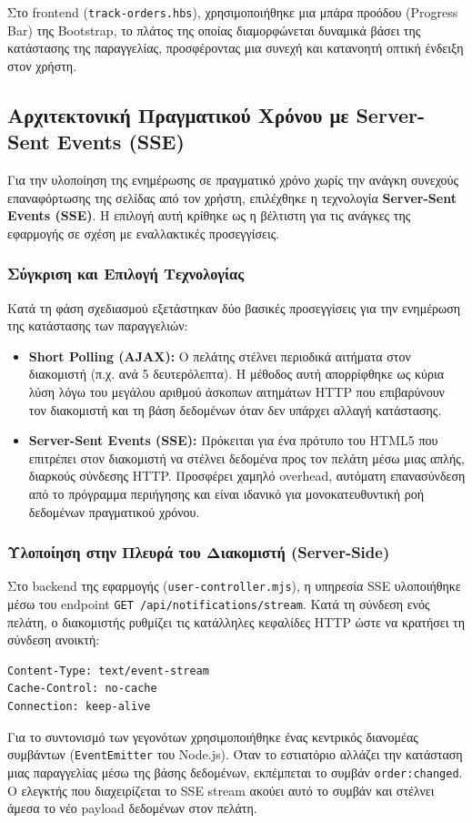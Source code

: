 \documentclass[acmsmall,screen,nonacm]{acmart}
\begin{document}
	Στο frontend (\texttt{track-orders.hbs}), χρησιμοποιήθηκε μια μπάρα προόδου (Progress Bar) της Bootstrap, το πλάτος της οποίας διαμορφώνεται δυναμικά βάσει της κατάστασης της παραγγελίας, προσφέροντας μια συνεχή και κατανοητή οπτική ένδειξη στον χρήστη.

	\subsection{Αρχιτεκτονική Πραγματικού Χρόνου με Server-Sent Events (SSE)}
	Για την υλοποίηση της ενημέρωσης σε πραγματικό χρόνο χωρίς την ανάγκη συνεχούς επαναφόρτωσης της σελίδας από τον χρήστη, επιλέχθηκε η τεχνολογία \textbf{Server-Sent Events (SSE)}. Η επιλογή αυτή κρίθηκε ως η βέλτιστη για τις ανάγκες της εφαρμογής σε σχέση με εναλλακτικές προσεγγίσεις.

	\subsubsection{Σύγκριση και Επιλογή Τεχνολογίας}
	Κατά τη φάση σχεδιασμού εξετάστηκαν δύο βασικές προσεγγίσεις για την ενημέρωση της κατάστασης των παραγγελιών:
	\begin{itemize}
		\item \textbf{Short Polling (AJAX):} Ο πελάτης στέλνει περιοδικά αιτήματα στον διακομιστή (π.χ. ανά 5 δευτερόλεπτα). Η μέθοδος αυτή απορρίφθηκε ως κύρια λύση λόγω του μεγάλου αριθμού άσκοπων αιτημάτων HTTP που επιβαρύνουν τον διακομιστή και τη βάση δεδομένων όταν δεν υπάρχει αλλαγή κατάστασης.
		\item \textbf{Server-Sent Events (SSE):} Πρόκειται για ένα πρότυπο του HTML5 που επιτρέπει στον διακομιστή να στέλνει δεδομένα προς τον πελάτη μέσω μιας απλής, διαρκούς σύνδεσης HTTP. Προσφέρει χαμηλό overhead, αυτόματη επανασύνδεση από το πρόγραμμα περιήγησης και είναι ιδανικό για μονοκατευθυντική ροή δεδομένων πραγματικού χρόνου.
	\end{itemize}

	\subsubsection{Υλοποίηση στην Πλευρά του Διακομιστή (Server-Side)}
	Στο backend της εφαρμογής (\texttt{user-controller.mjs}), η υπηρεσία SSE υλοποιήθηκε μέσω του endpoint \texttt{GET /api/notifications/stream}. Κατά τη σύνδεση ενός πελάτη, ο διακομιστής ρυθμίζει τις κατάλληλες κεφαλίδες HTTP ώστε να κρατήσει τη σύνδεση ανοικτή:
	\begin{verbatim}
Content-Type: text/event-stream
Cache-Control: no-cache
Connection: keep-alive
	\end{verbatim}
	Για το συντονισμό των γεγονότων χρησιμοποιήθηκε ένας κεντρικός διανομέας συμβάντων (\texttt{EventEmitter} του Node.js). Όταν το εστιατόριο αλλάζει την κατάσταση μιας παραγγελίας μέσω της βάσης δεδομένων, εκπέμπεται το συμβάν \texttt{order:changed}. Ο ελεγκτής που διαχειρίζεται το SSE stream ακούει αυτό το συμβάν και στέλνει άμεσα το νέο payload δεδομένων στον πελάτη.
	
\end{document}
